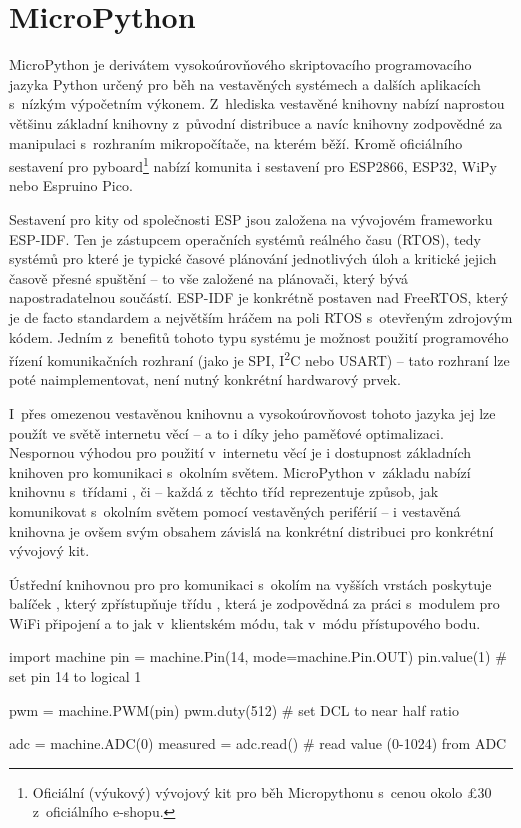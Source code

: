 \section{MicroPython}\label{sec:micropython}
MicroPython je derivátem vysokoúrovňového skriptovacího programovacího jazyka Python určený pro běh na vestavěných
systémech a dalších aplikacích s~nízkým výpočetním výkonem.
Z~hlediska vestavěné knihovny nabízí naprostou většinu základní knihovny z~původní distribuce a navíc knihovny
zodpovědné za manipulaci s~rozhraním mikropočítače, na kterém běží.
Kromě oficiálního sestavení pro pyboard\footnote{Oficiální (výukový) vývojový kit pro běh Micropythonu
s~cenou okolo \pounds30 z~oficiálního e-shopu.} nabízí komunita i sestavení pro ESP2866, ESP32, WiPy nebo
Espruino
Pico.

Sestavení pro kity od společnosti ESP jsou založena na vývojovém frameworku ESP-IDF.
Ten je zástupcem operačních systémů reálného času (RTOS), tedy systémů pro které je typické časové plánování
jednotlivých úloh a kritické jejich časově přesné spuštění -- to vše založené na plánovači, který bývá
napostradatelnou součástí.
ESP-IDF je konkrétně postaven nad FreeRTOS, který je de facto standardem a největším hráčem na poli RTOS s~otevřeným
zdrojovým kódem. 
Jedním z~benefitů tohoto typu systému je možnost použití programového řízení komunikačních rozhraní
(jako je SPI, I\textsuperscript{2}C nebo USART) -- tato rozhraní lze poté naimplementovat, není nutný konkrétní
hardwarový prvek.

I~přes omezenou vestavěnou knihovnu a vysokoúrovňovost tohoto jazyka jej lze použít ve světě internetu věcí --
a to i díky jeho paměťové optimalizaci.
Nespornou výhodou pro použití v~internetu věcí je i dostupnost základních knihoven pro komunikaci s~okolním světem.
MicroPython v~základu nabízí knihovnu  s~třídami ,  či  --
každá z~těchto tříd reprezentuje způsob, jak komunikovat s~okolním světem pomocí vestavěných periférií
-- i vestavěná knihovna je ovšem svým obsahem závislá na konkrétní distribuci pro konkrétní vývojový kit.

Ústřední knihovnou pro pro komunikaci s~okolím na vyšších vrstách poskytuje balíček , který zpřístupňuje
třídu , která je zodpovědná za práci s~modulem pro WiFi připojení a to jak v~klientském módu, tak v~módu
přístupového bodu.

\begin{code}[language=Python,caption={Ukázka práce s~periferiemi čipu pomocí vestavěných knihoven jazyka MicroPython
-- v~první části se jedná o~nastavení pinu na logickou hodnotu 1, prostřední část patří nastavení pulzně šířkové
modulace (PWM) na pinu čipu a konec je ve znamení čtení z~prvního kanálu analogově-digitálního převodníku (ADC).}]
import machine
pin = machine.Pin(14, mode=machine.Pin.OUT)
pin.value(1) # set pin 14 to logical 1

pwm = machine.PWM(pin)
pwm.duty(512) # set DCL to near half ratio

adc = machine.ADC(0)
measured = adc.read() # read value (0-1024) from ADC
\end{code}


